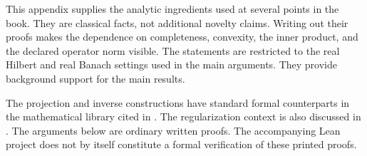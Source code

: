 \clearpage
{}\label{app:proof-tools}
This appendix supplies the analytic ingredients used at several points in the book. They are classical facts, not additional novelty claims. Writing out their proofs makes the dependence on completeness, convexity, the inner product, and the declared operator norm visible. The statements are restricted to the real Hilbert and real Banach settings used in the main arguments. They provide background support for the main results.

The projection and inverse constructions have standard formal counterparts in the mathematical library cited in \cite{mathlib-projection,mathlib-banach}. The regularization context is also discussed in \cite{clason-inverse}. The arguments below are ordinary written proofs. The accompanying Lean project does not by itself constitute a formal verification of these printed proofs.

